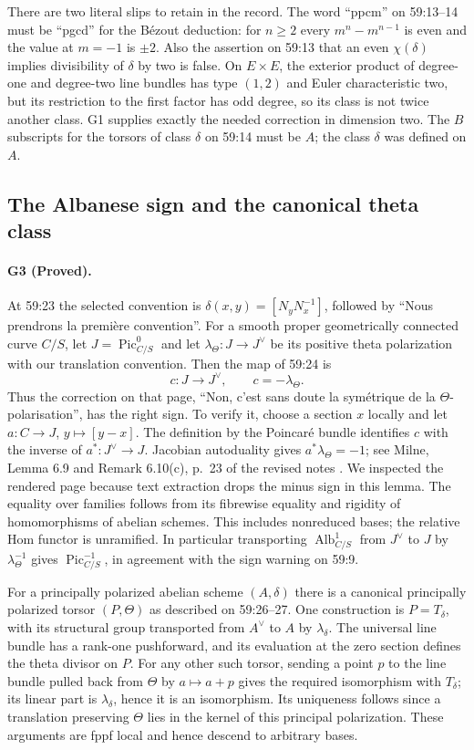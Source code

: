 There are two literal slips to retain in the record.  The word
``ppcm'' on 59:13--14 must be ``pgcd'' for the Bézout deduction:
for $n\geq2$ every $m^n-m^{n-1}$ is even and the value at $m=-1$
is $\pm2$.  Also the assertion on 59:13 that an even $\chi(\delta)$
implies divisibility of $\delta$ by two is false.  On $E\times E$,
the exterior product of degree-one and degree-two line bundles has
type $(1,2)$ and Euler characteristic two, but its restriction to
the first factor has odd degree, so its class is not twice another
class.  G1 supplies exactly the needed correction in dimension two.
The $B$ subscripts for the torsors of class $\delta$ on 59:14 must
be $A$; the class $\delta$ was defined on $A$.

\subsection{The Albanese sign and the canonical theta class}
\paragraph{G3 (Proved).}
At 59:23 the selected convention is
$\delta(x,y)=[N_yN_x^{-1}]$, followed by
``Nous prendrons la première convention''.  For a smooth proper
geometrically connected curve $C/S$, let $J=\operatorname{Pic}^0_{C/S}$
and let $\lambda_\Theta:J\to J^\vee$ be its positive theta
polarization with our translation convention.  Then the map of
59:24 is
\[
 c:J\longrightarrow J^\vee,\qquad c=-\lambda_\Theta.
\]
Thus the correction on that page, ``Non, c'est sans doute la
symétrique de la $\Theta$-polarisation'', has the right sign.
To verify it, choose a section $x$ locally and let
$a:C\to J$, $y\mapsto[y-x]$.  The definition by the Poincaré
bundle identifies $c$ with the inverse of
$a^*:J^\vee\to J$.  Jacobian autoduality gives
$a^*\lambda_\Theta=-1$; see Milne, Lemma 6.9 and
Remark 6.10(c), p.~23 of the revised notes
\cite{DGJ_MilneJac}.  We inspected the rendered page because text
extraction drops the minus sign in this lemma.  The equality over
families follows from its fibrewise equality and rigidity of
homomorphisms of abelian schemes.  This includes nonreduced bases;
the relative Hom functor is unramified.  In particular transporting
$\operatorname{Alb}^1_{C/S}$ from $J^\vee$ to $J$ by
$\lambda_\Theta^{-1}$ gives $\operatorname{Pic}^{-1}_{C/S}$, in
agreement with the sign warning on 59:9.

For a principally polarized abelian scheme $(A,\delta)$ there is a
canonical principally polarized torsor $(P,\Theta)$ as described
on 59:26--27.  One construction is $P=T_\delta$, with its structural
group transported from $A^\vee$ to $A$ by $\lambda_\delta$.
The universal line bundle has a rank-one pushforward, and its
evaluation at the zero section defines the theta divisor on $P$.
For any other such torsor, sending a point $p$ to the line bundle
pulled back from $\Theta$ by $a\mapsto a+p$ gives the required
isomorphism with $T_\delta$; its linear part is
$\lambda_\delta$, hence it is an isomorphism.  Its uniqueness
follows since a translation preserving $\Theta$ lies in the kernel
of this principal polarization.  These arguments are fppf local
and hence descend to arbitrary bases.

